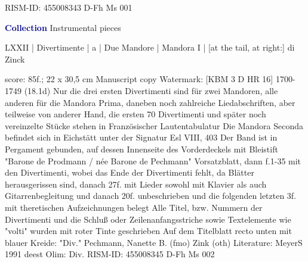 \documentclass[twocolumn]{book}
\begin{document}
\newline RISM-ID: 455008343
\newline D-Fh  Ms 001
\newline \par \vspace{7pt} \textcolor{darkblue}{\textbf{Collection}}
 Instrumental pieces
\newline \begin{itshape} LXXII | Divertimente | a | Due Mandore | Mandora I | [at the tail, at right:] di Zinck\end{itshape} 
\newline \textcolor{darkblue}{}  score: 85f.; 22 x 30,5 cm
\newline Manuscript copy
\newline Watermark: [KBM 3 D HR 16]  1700-1749 (18.1d)
\newline Nur die drei ersten Divertimenti sind für zwei Mandoren, alle anderen für die Mandora Prima, daneben noch zahlreiche Liedabschriften, aber teilweise von anderer Hand, die ersten 70 Divertimenti und später noch vereinzelte Stücke stehen in Französischer Lautentabulatur
\newline Die Mandora Seconda befindet sich in Eichstätt unter der Signatur Esl VIII, 403
\newline Der Band ist in Pergament gebunden, auf dessen Innenseite des Vorderdeckels mit Bleistift "Barone de Prodmann / née Barone de Pechmann"
\newline Vorsatzblatt, dann f.1-35 mit den Divertimenti, wobei das Ende der Divertimenti fehlt, da Blätter herausgerissen sind, danach 27f. mit Lieder sowohl mit Klavier als auch Gitarrenbegleitung und danach 20f. unbeschrieben und die folgenden letzten 3f. mit theretischen Aufzeichnungen belegt
\newline Alle Titel, bzw. Nummern der Divertimenti und die Schluß oder Zeilenanfangsstriche sowie Textelemente wie "volti" wurden mit roter Tinte geschrieben
\newline Auf dem Titelblatt recto unten mit blauer Kreide: "Div."
\newline Pechmann, Nanette B.  (fmo)
\newline Zink  (oth)
\newline Literature: MeyerS 1991  deest
\newline Olim: Div.
\newline RISM-ID: 455008345
\newline D-Fh  Ms 002
    \clearpage  
\end{document}

